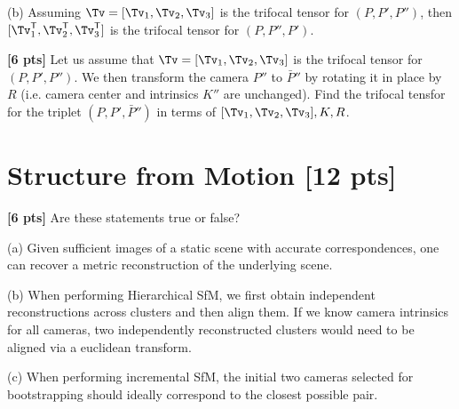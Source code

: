 \documentclass[11pt,addpoints,answers]{exam}
\numberwithin{equation}{section} %
\numberwithin{figure}{section} %
\numberwithin{table}{section} %
\begin{document}
\begin{questions}
(b) Assuming $\Tv = [\Tv_1, \Tv_2, \Tv_3]$ is the trifocal tensor for $(P, P', P'')$, then $ [\Tv_1^{\mathsf{T}}, \Tv_2^{\mathsf{T}}, \Tv_3^{\mathsf{T}}]$ is the trifocal tensor for $(P, P'', P')$. 

\begin{tcolorbox}[fit,height=8cm, width=\textwidth, blank, borderline={0.5pt}{-2pt},halign=left, valign=center, nobeforeafter]


\end{tcolorbox}

\question \textbf{[6 pts]} Let us assume that $\Tv = [\Tv_1, \Tv_2, \Tv_3]$ is the trifocal tensor for $(P, P', P'')$. We then transform the camera $P''$ to $\bar{P}''$ by rotating it in place by $R$ (i.e. camera center and intrinsics $K''$ are unchanged). Find the trifocal tensfor for the triplet $(P, P', \bar{P}'')$ in terms of $ [\Tv_1, \Tv_2, \Tv_3], K, R$.

\begin{tcolorbox}[fit,height=8cm, width=\textwidth, blank, borderline={0.5pt}{-2pt},halign=left, valign=center, nobeforeafter]


\end{tcolorbox}

\newpage

\section{Structure from Motion [12 pts]}

\question \textbf{[6 pts]} Are these statements true or false?  

(a) Given sufficient images of a static scene with accurate correspondences, one can recover a metric reconstruction of the underlying scene.

(b) When performing Hierarchical SfM, we first obtain independent reconstructions across clusters and then align them. If we know camera intrinsics for all cameras, two independently reconstructed clusters would need to be aligned via a euclidean transform.

(c) When performing incremental SfM, the initial two cameras selected for bootstrapping should ideally correspond to the closest possible pair.

\begin{tcolorbox}[fit,height=16cm, width=\textwidth, blank, borderline={0.5pt}{-2pt},halign=left, valign=center, nobeforeafter]


\end{tcolorbox}


\end{questions}
\end{document}
